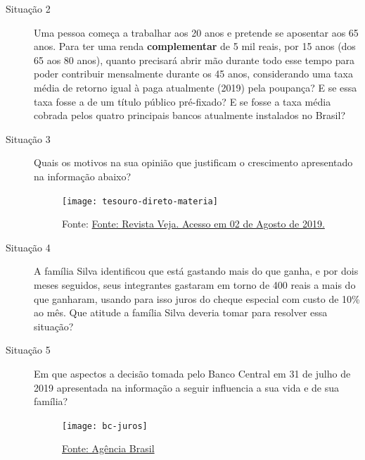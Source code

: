\begin{description}
\item[{Situação 2}] \leavevmode{}\label{fin-def-2}
Uma pessoa começa a trabalhar aos 20 anos e pretende se aposentar aos 65 anos. Para ter uma renda \textbf{complementar} de 5 mil reais, por 15 anos (dos 65 aos 80 anos), quanto precisará abrir mão durante todo esse tempo para poder contribuir mensalmente durante os 45 anos, considerando uma taxa média de retorno igual à paga atualmente (2019) pela poupança? E se essa taxa fosse a de um título público pré-fixado? E se fosse a taxa média cobrada pelos quatro principais bancos atualmente instalados no Brasil? 
\end{description}

\begin{description}
\item[{Situação 3}] \leavevmode{}\label{fin-def-3}

Quais os motivos na sua opinião que justificam o crescimento apresentado na informação abaixo?

\begin{figure}[H]

\centering
\noindent\texttt{[image: tesouro-direto-materia]}

\caption{Fonte: \href{https://veja.abril.com.br/economia/investidores-no-tesouro-direto-crescem-36-no-primeiro-semestre/}{Fonte: Revista Veja. Acesso em 02 de Agosto de 2019.}}
\end{figure}

\end{description}

\begin{description}
\item[{Situação 4}] \leavevmode{}\label{fin-def-4}
A família Silva identificou que está gastando mais do que ganha, e por dois meses seguidos, seus integrantes gastaram em torno de 400 reais a mais do que ganharam, usando para isso juros do cheque especial com custo de 10\% ao mês. Que atitude a família Silva deveria tomar para resolver essa situação? 
\end{description}

\begin{description}
\item[{Situação 5}] \leavevmode{}\label{fin-def-5}
Em que aspectos a decisão tomada pelo Banco Central em 31 de julho de 2019 apresentada na informação a seguir influencia a sua vida e de sua família?

\begin{figure}[H]

\centering
\noindent\texttt{[image: bc-juros]}

\caption{\href{http://agenciabrasil.ebc.com.br/economia/noticia/2019-07/banco-central-surpreende-e-reduz-juros-basicos-para-6-ao-ano. Acesso em 15 de Agosto de 2019.}{Fonte: Agência Brasil}}
\end{figure}
\end{description}

